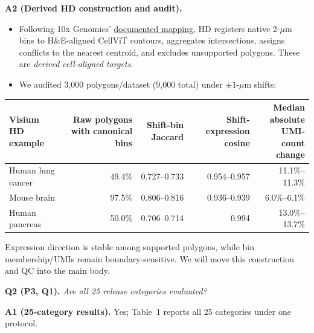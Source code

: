 \documentclass[10pt]{article}
\newcommand{\questionsep}{\par\vspace{1.1em}}
\begin{document}
\textbf{A2 (Derived HD construction and audit).}
\begin{itemize}
\item Following 10x Genomics'
\href{https://www.10xgenomics.com/support/software/space-ranger/latest/analysis/segmented-outputs}{documented
mapping}, HD registers native 2-\(\mu\)m bins to H\&E-aligned CellViT
contours, aggregates intersections, assigns conflicts to the nearest centroid,
and excludes unsupported polygons. These are \emph{derived cell-aligned
targets}.
\item We audited 3,000 polygons/dataset (9,000 total) under
\(\pm1\)-\(\mu\)m shifts:
\end{itemize}

\begin{center}
\begingroup
\scriptsize
\setlength{\tabcolsep}{2pt}
\begin{tabularx}{\linewidth}{@{}Xrrrr@{}}
\toprule
Visium HD example & Raw polygons with canonical bins & Shift-bin Jaccard &
Shift-expression cosine & \shortstack{Median absolute\\UMI-count change} \\
\midrule
Human lung cancer & 49.4\% & 0.727--0.733 & 0.954--0.957 & 11.1\%--11.3\% \\
Mouse brain & 97.5\% & 0.806--0.816 & 0.936--0.939 & 6.0\%--6.1\% \\
Human pancreas & 50.0\% & 0.706--0.714 & 0.994 & 13.0\%--13.7\% \\
\bottomrule
\end{tabularx}
\endgroup
\end{center}

Expression direction is stable among supported polygons, while bin
membership/UMIs remain boundary-sensitive. We will move this construction and
QC into the main body.

\newpage
\questionsep
\textbf{Q2 (P3, Q1).}\quad
\textit{Are all 25 release categories evaluated?}

\textbf{A1 (25-category results).}\enspace
Yes; Table~1 reports all 25 categories under one protocol.
\end{document}
